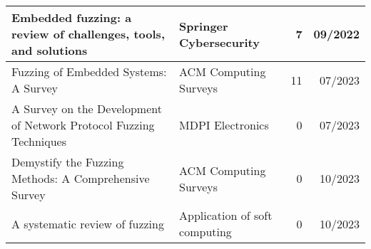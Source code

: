 \documentclass{article}
\begin{document}
\begin{longtable}{|P{0.44\textwidth}|P{0.32\textwidth}|r|r|}
  Embedded fuzzing: a review of challenges, tools, and solutions\cite{Embedded2}                                                                     & Springer Cybersecurity                                     & 7              & 09/2022       \\\hline
  Fuzzing of Embedded Systems: A Survey\cite{Embedded}                                                                                               & ACM Computing Surveys                                      & 11             & 07/2023       \\\hline
  A Survey on the Development of Network Protocol Fuzzing Techniques\cite{Network2023}                                                               & MDPI Electronics                                           & 0              & 07/2023       \\\hline
  Demystify the Fuzzing Methods: A Comprehensive Survey\cite{Demystifying}                                                                           & ACM Computing Surveys                                      & 0              & 10/2023       \\\hline
  A systematic review of fuzzing\cite{SystematicReview2023}                                                                                          & Application of soft computing                              & 0              & 10/2023       \\\hline
\end{longtable}

\pagebreak
\end{document}
